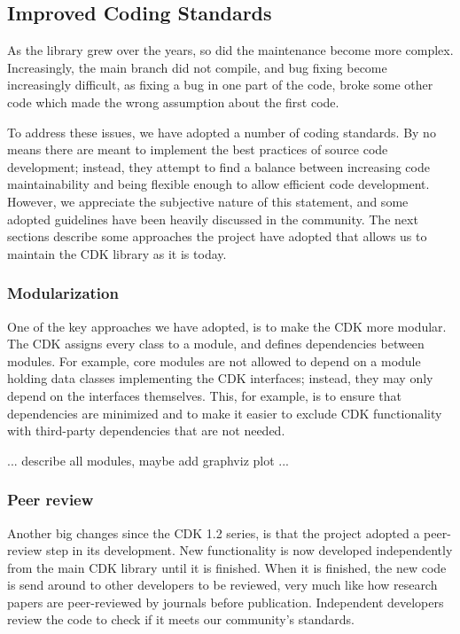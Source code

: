 \documentclass[10pt]{bmc_article}
\newenvironment{bmcformat}{\begin{raggedright}\baselineskip20pt\sloppy\setboolean{publ}{false}}{\end{raggedright}\baselineskip20pt\sloppy}
\begin{document}
\begin{bmcformat}
\subsection*{Improved Coding Standards}

As the library grew over the years, so did the maintenance become more complex. Increasingly,
the main branch did not compile, and bug fixing become increasingly difficult, as fixing a bug
in one part of the code, broke some other code which made the wrong assumption about the first
code.

To address these issues, we have adopted a number of coding standards. By no means there are
meant to implement the best practices of source code development; instead, they attempt to find
a balance between increasing code maintainability and being flexible enough to allow efficient
code development. However, we appreciate the subjective nature of this statement, and some
adopted guidelines have been heavily discussed in the community.
The next sections describe some approaches the project have adopted that allows us to
maintain the CDK library as it is today. 

  \subsubsection*{Modularization}
  
One of the key approaches we have adopted, is to make the CDK more modular. The CDK assigns
every class to a module, and defines dependencies between modules. For example, core modules
are not allowed to depend on a module holding data classes implementing the CDK interfaces;
instead, they may only depend on the interfaces themselves. This, for example, is to ensure
that dependencies are minimized and to make it easier to exclude CDK functionality with
third-party dependencies that are not needed.

... describe all modules, maybe add graphviz plot ...

  \subsubsection*{Peer review}
  
Another big changes since the CDK 1.2 series, is that the project adopted a peer-review
step in its development. New functionality is now developed independently from the main
CDK library until it is finished. When it is finished, the new code is send around to
other developers to be reviewed, very much like how research papers are peer-reviewed
by journals before publication. Independent developers review the code to check if it 
meets our community's standards.




\end{bmcformat}
\end{document}
